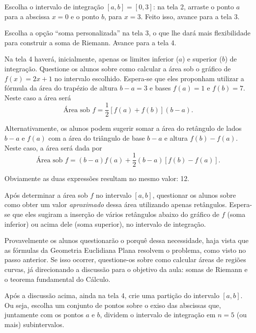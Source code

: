 \documentclass[a4paper,12pt]{scrartcl}
\begin{document}
\begin{compactenum}
      \item Escolha o intervalo de integração $[a,b]=[0,3]$: na tela 2, arraste o ponto $a$ para a abscissa $x = 0$ e o ponto $b$, para $x = 3$. Feito isso, avance para a tela 3.
      
      \item Escolha a opção ``soma personalizada'' na tela 3, o que lhe dará mais flexibilidade para construir a soma de Riemann. Avance para a tela 4.
      
      \item \label{step:area} Na tela 4 haverá, inicialmente, apenas os limites inferior ($a$) e superior ($b$) de integração. Questione os alunos sobre como calcular a área sob o gráfico de $f(x) = 2x + 1$ no intervalo escolhido. Espera-se que eles proponham utilizar a fórmula da área do trapézio de altura $b - a = 3$ e bases $f(a) = 1$ e $f(b) = 7$. Neste caso a área será
      \begin{equation*}
	\text{Área sob $f$} = \frac{1}{2}\left[f(a) + f(b)\right](b - a).
      \end{equation*}
      
      Alternativamente, os alunos podem sugerir somar a área do retângulo de lados $b - a$ e $f(a)$ com a área do triângulo de base $b - a$ e altura $f(b) - f(a)$. Neste caso, a área será dada por
      \begin{equation*}
       \text{Área sob $f$} = (b - a)f(a) + \frac{1}{2}(b - a)\left[f(b) - f(a)\right].
      \end{equation*}
      
      Obviamente as duas expressões resultam no mesmo valor: 12.

      \item Após determinar a área sob $f$ no intervalo $[a,b]$, questionar os alunos sobre como obter um valor \emph{aproximado} dessa área utilizando apenas retângulos. Espera-se que eles sugiram a inserção de vários retângulos abaixo do gráfico de $f$ (soma inferior) ou acima dele (soma superior), no intervalo de integração.
      
      Provavelmente os alunos questionarão o porquê dessa necessidade, haja vista que as fórmulas da Geometria Euclidiana Plana resolvem o problema, como visto no passo anterior. Se isso ocorrer, questione-os sobre como calcular áreas de regiões curvas, já direcionando a discussão para o objetivo da aula: somas de Riemann e o teorema fundamental do Cálculo.
    
      \item Após a discussão acima, ainda na tela 4, crie uma partição do intervalo $[a,b]$. Ou seja, escolha um conjunto de pontos sobre o exiso das abscissas que, juntamente com os pontos $a$ e $b$, dividem o intervalo de integração em $n = 5$ (ou mais) subintervalos. 
      

\end{compactenum}
\end{document}
